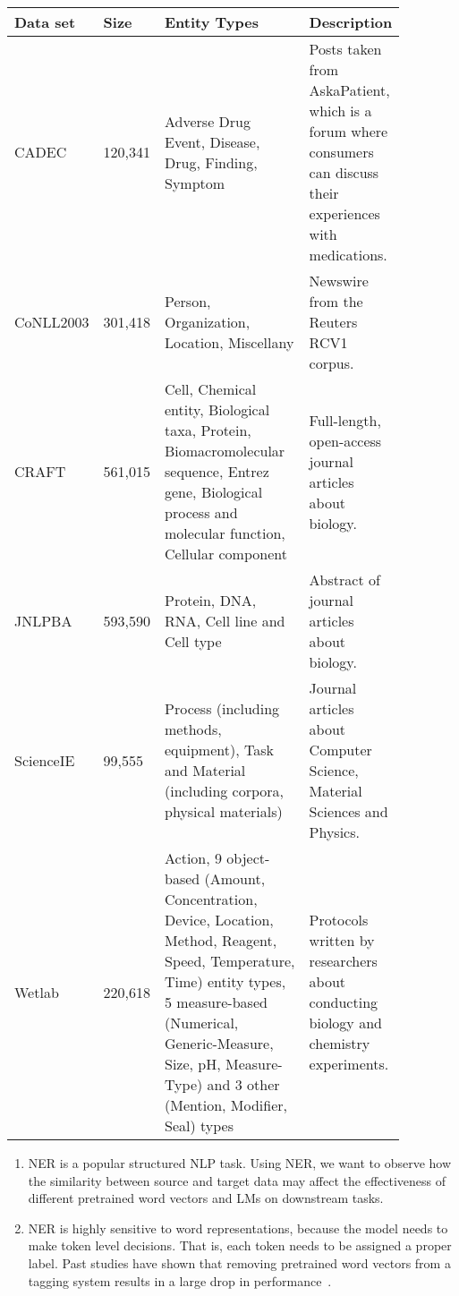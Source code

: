 \documentclass[11pt,a4paper]{article}
\begin{document}
\begin{table*}[tb]
\begin{small}
\begin{center}
\begin{tabular}{p{0.1\linewidth}p{0.09\linewidth}p{0.43\linewidth}p{0.25\linewidth}}
\toprule
\bf Data set & \bf Size & \bf Entity Types & \bf Description \\ \midrule
CADEC & 120,341 & Adverse Drug Event, Disease, Drug, Finding, Symptom & Posts taken from AskaPatient, which is a forum where consumers can discuss their experiences with medications. \\ \midrule
CoNLL2003 & 301,418 & Person, Organization, Location, Miscellany & Newswire from the Reuters RCV1 corpus. \\ \midrule
CRAFT & 561,015 & Cell, Chemical entity, Biological taxa, Protein, Biomacromolecular sequence, Entrez gene, Biological process and molecular function, Cellular component & Full-length, open-access journal articles about biology. \\ \midrule
JNLPBA & 593,590 & Protein, DNA, RNA, Cell line and Cell
type & Abstract of journal articles about biology. \\ \midrule
ScienceIE & 99,555 & Process (including methods, equipment), Task and Material (including corpora, physical materials) & Journal articles about Computer Science, Material Sciences and Physics. \\ \midrule
Wetlab & 220,618 & Action, 9 object-based (Amount, Concentration, Device, Location, Method, Reagent, Speed, Temperature, Time) entity types, 5 measure-based (Numerical, Generic-Measure, Size, pH, Measure-Type) and 3 other (Mention, Modifier, Seal) types & Protocols written by researchers about conducting biology and chemistry experiments. \\ 
\bottomrule
\end{tabular}
\caption{\label{tbl-targetdata}List of the target NER data sets and their specifications. Size is shown in number of tokens.}
\end{center}
\end{small}
\end{table*}


\begin{enumerate}
\item NER is a popular structured NLP task. 
Using NER, we want to observe how the similarity between source and target data may affect the effectiveness of different pretrained word vectors and LMs on downstream tasks.
\item NER is highly sensitive to word representations, because the model needs to make token level decisions. 
That is, each token needs to be assigned a proper label. 
Past studies have shown that removing pretrained word vectors from a tagging system results in a large drop in performance~\cite{Huang:Xu:arXiv:2015,Lample:Ballesteros:NAACL:2016}.
\end{enumerate}
\end{document}

